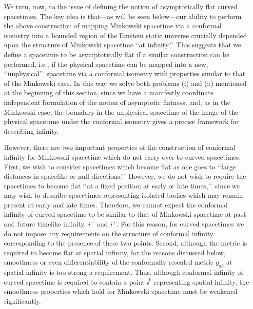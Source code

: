 We turn, now, to the issue of defining the notion of asymptotically flat curved
spacetimes. The key idea is that---as will be seen below---our ability to perform the
above construction of mapping Minkowski spacetime via a conformal isometry into a
bounded region of the Einstein static universe crucially depended upon the structure
of Minkowski spacetime \lq\lq at infinity.\rq\rq\ This suggests that we define a spacetime
to be asymptotically flat if a similar construction can be performed, i.e., if the
physical spacetime can be mapped into a new, \lq\lq unphysical\rq\rq\ spacetime via a
conformal isometry with properties similar to that of the Minkowski case. In this way
we solve both problems (i) and (ii) mentioned at the beginning of this section, since
we have a manifestly coordinate independent formulation of the notion of asymptotic
flatness, and, as in the Minkowski case, the boundary in the unphysical spacetime of
the image of the physical spacetime under the conformal isometry gives a precise
framework for describing infinity.

However, there are two important properties of the construction of conformal infinity
for Minkowski spacetime which do not carry over to curved spacetimes. First, we wish
to consider spacetimes which become flat as one goes to \lq\lq large distances in
spacelike or null directions.\rq\rq\ However, we do not wish to require the spacetimes
to become flat \lq\lq at a fixed position at early or late times,\rq\rq\ since we may wish to
describe spacetimes representing isolated bodies which may remain present at early
and late times. Therefore, we cannot expect the conformal infinity of curved
spacetime to be similar to that of Minkowski spacetime at past and future timelike
infinity, \(i^-\) and \(i^+\). For this reason, for curved spacetimes we do not impose
any requirements on the structure of conformal infinity corresponding to the presence
of these two points. Second, although the metric is required to become flat at spatial
infinity, for the reasons discussed below, smoothness or even differentiability of the
conformally rescaled metric \(\tilde g_{ab}\) at spatial infinity is too strong a
requirement. Thus, although conformal infinity of curved spacetime is required to
contain a point \(\ii^0\) representing spatial infinity, the smoothness properties which
hold for Minkowski spacetime must be weakened significantly.

